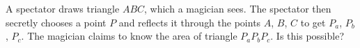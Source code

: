 A spectator draws triangle $ABC$, which a magician sees. The spectator then secretly chooses a point $P$ and reflects it through the points $A$, $B$, $C$ to get $P_a$, $P_b$, $P_c$. The magician claims to know the area of triangle $P_aP_bP_c$. Is this possible?
